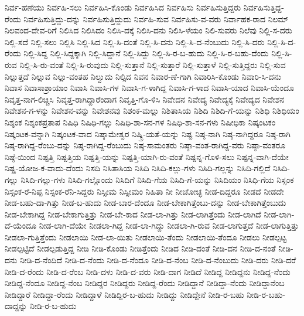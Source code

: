 ನಿರ್ವ-ಹಣೆಯು
ನಿರ್ವಹಿ-ಸಲು
ನಿರ್ವಹಿಸಿ-ಕೊಂಡು
ನಿರ್ವಹಿಸಿದ
ನಿರ್ವಹಿಸು
ನಿರ್ವಹಿಸುತ್ತಿದ್ದರು
ನಿರ್ವಹಿಸುತ್ತಿದ್ದ-ರೆಂದು
ನಿರ್ವಹಿಸುತ್ತಿದ್ದು-ದನ್ನು
ನಿರ್ವಹಿಸುತ್ತಿದ್ದುದು
ನಿರ್ವಹಿ-ಸುವ
ನಿರ್ವಹಿಸು-ವ-ವರು
ನಿರ್ವಾಹಕ-ರಾದ
ನಿಲಮ್
ನಿಲವಂದ-ದೇವ-ರಿಗೆ
ನಿಲಿಸಿದ
ನಿಲಿಸಿದಂ
ನಿಲಿಸಿ-ದಕ್ಕೆ
ನಿಲಿಸಿ-ದನು
ನಿಲಿಸಿ-ಳೆಯಂ
ನಿಲಿ-ಸುವರು
ನಿಲೆವು
ನಿಲ್ಲಿ-ಸ-ದರು
ನಿಲ್ಲಿ-ಸದೆ
ನಿಲ್ಲಿ-ಸಲು
ನಿಲ್ಲಿಸಿ
ನಿಲ್ಲಿ-ಸಿದ
ನಿಲ್ಲಿ-ಸಿ-ದಂತೆ
ನಿಲ್ಲಿ-ಸಿ-ದನು
ನಿಲ್ಲಿ-ಸಿ-ದ-ನೆಂಬುದು
ನಿಲ್ಲಿ-ಸಿ-ದರು
ನಿಲ್ಲಿ-ಸಿ-ದ-ರೆಂದು
ನಿಲ್ಲಿ-ಸಿದ್ದ
ನಿಲ್ಲಿ-ಸಿದ್ದಕ್ಕಾಗಿ
ನಿಲ್ಲಿ-ಸಿದ್ದಾನೆ
ನಿಲ್ಲಿ-ಸಿದ್ದು
ನಿಲ್ಲಿ-ಸಿ-ರ-ಬ-ಹುದು
ನಿಲ್ಲಿ-ಸಿ-ರ-ಬಹು-ದೆಂದು
ನಿಲ್ಲಿ-ಸಿ-ರುವ
ನಿಲ್ಲಿ-ಸಿ-ರು-ವಂತೆ
ನಿಲ್ಲಿ-ಸಿ-ರುವುದು
ನಿಲ್ಲಿ-ಸುತ್ತಾನೆ
ನಿಲ್ಲಿ-ಸುತ್ತಾರೆ
ನಿಲ್ಲಿ-ಸುತ್ತಾಳೆ
ನಿಲ್ಲಿ-ಸುತ್ತಿದ್ದರು
ನಿಲ್ಲಿ-ಸುವ
ನಿಲ್ಲುತ್ತದೆ
ನಿಲ್ಲುವ
ನಿಲ್ಲು-ವಂತಹ
ನಿಲ್ವುದು
ನಿಲ್ಸಿದ
ನಿವನ
ನಿವಾರ-ಣೆ-ಗಾಗಿ
ನಿವಾರಿಸಿ-ಕೊಂಡು
ನಿವಾರಿ-ಸಿ-ದನು
ನಿವಾಸ
ನಿವಾಸಾಶ್ರಾಯಾಂ
ನಿವಾಸಿ
ನಿವಾಸಿ-ಗಳ
ನಿವಾಸಿ-ಗ-ಳಾಗಿದ್ದ
ನಿವಾಸಿ-ಗ-ಳಾದ
ನಿವಾಸಿ-ಯಾದ
ನಿವಾಸಿ-ಯೆಂದೂ
ನಿವೃತ್ತ-ನಾಗ-ಲಿಚ್ಚಿಸಿ
ನಿವೃತ್ತ-ರಾಗಿದ್ದಾರೆಂದಾಗ
ನಿವೃತ್ತಿ-ಗೊ-ಳಿಸಿ
ನಿವೇದನ
ನಿವೇದ್ಯ
ನಿವೇದ್ಯಕ್ಕೆ
ನಿವೇದ್ಯದ
ನಿವೇಶನ
ನಿವೇಶನ-ಗ-ಳನ್ನು
ನಿವೇಶನ-ವನ್ನು
ನಿವೇಶನವು
ನಿಶಂಕ-ಮಲ್ಲು
ನಿಶಿತಾಸಿಯ
ನಿಶಿದಿ
ನಿಶಿದಿ-ಗೆ-ಯನ್ನು
ನಿಶಿಧಿ
ನಿಶಿಧಿಯಂ
ನಿಶ್ಶಂಕ
ನಿಶ್ಶಂಕಪ್ರತಾಪ
ನಿಷಿಧಿ
ನಿಷಿಧಿ-ಗಲ್ಲು
ನಿಷಿಧಿ-ಶಾ-ಸನ-ಗಳ
ನಿಷಿಧಿ-ಶಾ-ಸನ-ಗಳು
ನಿಷೀಧಿಕಾ
ನಿಷ್ಕಂಟಕಂ
ನಿಷ್ಕಂಟಕ-ವನ್ನಾಗಿ
ನಿಷ್ಕಂಟಕ-ವಾದ
ನಿಷ್ಕಾಮೇಶ್ವರ
ನಿಷ್ಕ್ರಿ-ಯತೆ-ಯನ್ನು
ನಿಷ್ಟ
ನಿಷ್ಠ-ನಾಗಿ
ನಿಷ್ಠ-ನಾಗಿದ್ದರೂ
ನಿಷ್ಠ-ರಾಗಿ
ನಿಷ್ಠ-ರಾಗಿದ್ದ-ರೆಂಬು-ದನ್ನು
ನಿಷ್ಠ-ರಾಗಿದ್ದ-ರೆಂಬುದು
ನಿಷ್ಠ-ಸಾಮಂತರು
ನಿಷ್ಠಾ-ವಂತ-ರಾಗಿದ್ದ-ವರು
ನಿಷ್ಠಾ-ವಂತರೂ
ನಿಷ್ಠೆ-ಯಿಂದ
ನಿಷ್ಪತ್ತಿ
ನಿಷ್ಪತ್ತಿಯ
ನಿಷ್ಪತ್ತಿ-ಯನ್ನು
ನಿಷ್ಪತ್ತಿ-ಯಾಗಿ-ರು-ವಂತೆ
ನಿಷ್ಪನ್ನ-ಗೊಳಿ-ಸಲು
ನಿಷ್ಪನ್ನ-ವಾಗಿ-ದೆಯೇ
ನಿಷ್ಪ್ರ-ಯೋಜ-ಕ-ವಾದು-ದೆಂದು
ನಿಸದಿ
ನಿಸಿತಾಸಿಯ
ನಿಸಿದಿ
ನಿಸಿದಿ-ಕಲ್ಲು-ಗಳು
ನಿಸಿದಿ-ಗಲ್ಲನ್ನು
ನಿಸಿದಿ-ಗಲ್ಲಿದೆ
ನಿಸಿದಿ-ಗಲ್ಲು
ನಿಸಿದಿ-ಗಲ್ಲು-ಗಳು
ನಿಸಿದಿ-ಗಲ್ಲೊಂದು
ನಿಸಿದಿಗೆ
ನಿಸಿದಿ-ಗೆಯ
ನಿಸಿದಿ-ಗೆ-ಯನ್ನು
ನಿಸಿದಿಯಂ
ನಿಸಿಧಿ-ಗೆಯ
ನಿಸ್ಸಂಕ
ನಿಸ್ಸಂಕ-ರೆ-ನಿಪ್ಪ
ನಿಸ್ಸಂಕ-ರೆನಿ-ಸಿದ್ದರು
ನಿಸ್ಸೀಮ
ನಿಸ್ಸೀಮಂ
ನಿಹಿತಾ
ನೀ
ನೀಚೋಚ್ಛ
ನೀಡ-ದಿದ್ದರೂ
ನೀಡದೆ
ನೀಡದೇ
ನೀಡ-ಬಹು-ದಾ-ಗಿತ್ತು
ನೀಡ-ಬ-ಹುದು
ನೀಡ-ಬಾರ-ದೆಂದೂ
ನೀಡ-ಬೇಕಾಗಿತ್ತೆಂಬು-ದನ್ನು
ನೀಡ-ಬೇಕಾಗಿತ್ತೆಂಬುದು
ನೀಡ-ಬೇಕಾಗಿದ್ದ
ನೀಡ-ಬೇಕಾಗುತ್ತಿತ್ತು
ನೀಡ-ಬೇ-ಕಾದ
ನೀಡ-ಲಾ-ಗಿತ್ತು
ನೀಡ-ಲಾಗಿತ್ತೆಂದು
ನೀಡ-ಲಾಗಿದೆ
ನೀಡ-ಲಾಗಿ-ದೆ-ಯೆಂದೂ
ನೀಡ-ಲಾಗಿ-ದೆಯೇ
ನೀಡಲಾ-ಗಿದ್ದ
ನೀಡ-ಲಾ-ಗಿದ್ದು
ನೀಡಲಾ-ಗಿ-ರುವ
ನೀಡ-ಲಾಗುತ್ತದೆ
ನೀಡ-ಲಾಗುತ್ತಿತ್ತು
ನೀಡಲಾ-ಗುತ್ತಿತ್ತೆಂದು
ನೀಡಲಾಯಿ
ನೀಡ-ಲಾ-ಯಿತು
ನೀಡಲಾಯಿ-ತೆಂದು
ನೀಡಲಾಯಿ-ತೆಂದೂ
ನೀಡಲು
ನೀಡಲ್ಪಟ್ಟ
ನೀಡಲ್ಪಟ್ಟಿದೆ
ನೀಡಲ್ಪಡುತ್ತಿದ್ದ
ನೀಡಿ
ನೀಡಿ-ಕೊಂಡು
ನೀಡಿತ್ತೆಂದು
ನೀಡಿದ
ನೀಡಿ-ದಂತೆ
ನೀಡಿ-ದನ
ನೀಡಿ-ದ-ನಂತೆ
ನೀಡಿ-ದನು
ನೀಡಿ-ದ-ನೆಂದಿದೆ
ನೀಡಿ-ದ-ನೆಂದು
ನೀಡಿ-ದ-ನೆಂದೂ
ನೀಡಿ-ದ-ನೆಂಬ
ನೀಡಿ-ದ-ನೆಂಬುದು
ನೀಡಿ-ದರು
ನೀಡಿ-ದರೆ
ನೀಡಿ-ದ-ರೆಂದು
ನೀಡಿ-ದ-ರೆಂಬ
ನೀಡಿ-ದಳು
ನೀಡಿ-ದ-ವರು
ನೀಡಿ-ದಾಗ
ನೀಡಿದೆ
ನೀಡಿದ್ದ
ನೀಡಿದ್ದನು
ನೀಡಿದ್ದ-ನೆಂದು
ನೀಡಿದ್ದ-ನೆಂದೂ
ನೀಡಿದ್ದ-ನೆಂಬ
ನೀಡಿದ್ದರ
ನೀಡಿದ್ದರು
ನೀಡಿದ್ದ-ರೆಂದು
ನೀಡಿದ್ದಾನೆ
ನೀಡಿದ್ದಾ-ನೆಂದು
ನೀಡಿದ್ದಾನೆಂಬ
ನೀಡಿದ್ದಾರೆ
ನೀಡಿದ್ದಾ-ರೆಂದು
ನೀಡಿದ್ದಾಳೆ
ನೀಡಿದ್ದಿರ-ಬ-ಹುದು
ನೀಡಿದ್ದು
ನೀಡಿದ್ದೇನೆ
ನೀಡಿ-ರ-ಬಹು
ನೀಡಿ-ರ-ಬಹು-ದಾದ್ದನ್ನು
ನೀಡಿ-ರ-ಬ-ಹುದು
